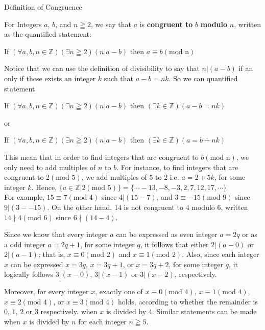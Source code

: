 \begin{definition}
Definition of Congruence

\begin{tcolorbox}
For Integers $a$, $b$, and $n \geqq 2$, we say that $a$ is {\bf congruent to} $b$ {\bf modulo} $n$, written as the quantified statement: 
	\begin{center}
		If $(\forall a,b,n \in \mathbb{Z})(\exists n \geqq 2)(n | a-b)$ then  $a \equiv b(\text{mod n})$
	\end{center}
Notice that  we can use the definition of divisibility to say that $n | (a-b)$ if an only if these exists an integer $k$ such that $a-b = nk$. So we can quantified statement
	\begin{center}
		If $(\forall a,b,n \in \mathbb{Z})(\exists n \geqq 2)(n | a-b)$ then  $(\exists k \in \mathbb{Z})(a-b = nk)$
	\end{center}
or
	\begin{center}
		If $(\forall a,b,n \in \mathbb{Z})(\exists n \geqq 2)(n | a-b)$ then  $(\exists k \in \mathbb{Z})(a= b + nk)$
	\end{center}

\end{tcolorbox}
This mean that in order to find integers that are congruent to $b(\text{mod n})$, we only need to add multiples of $n$ to $b$. For instance, to find integers that are congruent to $2(\text{mod 5})$, we add multiples of $5$ to $2$ i.e. $a = 2 + 5k$, for some integer $k$. Hence, $\{ a \in \mathbb{Z} | 2(\text{mod 5})\} = \{ \cdots -13, -8, -3, 2, 7, 12, 17, \cdots \}$ \\

For example, $15 \equiv 7 (\text{mod 4})$ since $4 | (15-7)$, and $3 \equiv -15 (\text{mod 9})$ since $9 | (3--15)$. On the other hand, $14$ is not congruent to $4$ modulo $6$, written $14 \nmid 4 (\text{mod 6})$ since $ 6 \nmid (14 -4)$.

Since we know that every integer $a$ can be expressed as even integer $a = 2q$ or as a odd integer $a = 2q + 1$, for some integer $q$, it follows that either $2 | (a -0)$ or $2 | (a - 1)$; that is, $x \equiv 0 (\text{mod 2})$ and $x \equiv 1 (\text{mod 2})$. Also, since each integer $x$ can be expressed $x = 3q$, $x = 3q + 1$, or $x = 3q + 2$, for some integer $q$, it logically follows $3 | (x - 0)$, $3 | (x-1)$ or $3 | (x - 2)$, respectively. 

Moreover, for every integer $x$, exactly one of $x \equiv 0(\text{mod 4})$, $x \equiv 1(\text{mod 4})$, $x \equiv 2(\text{mod 4})$, or $x \equiv 3(\text{mod 4})$ holds, according to whether the remainder is $0$, $1$, $2$ or $3$ respectively. when $x$ is divided by $4$. Similar statements can be made when $x$ is divided by $n$ for each integer $n \geqq 5$. 

\end{definition}







